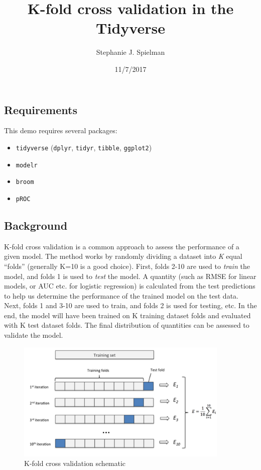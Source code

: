 \documentclass[]{article}
\title{K-fold cross validation in the Tidyverse}
\author{Stephanie J. Spielman}
\date{11/7/2017}
\providecommand{\tightlist}{%
  \setlength{\itemsep}{0pt}\setlength{\parskip}{0pt}}
\begin{document}
\maketitle

\subsection{Requirements}\label{requirements}

This demo requires several packages:

\begin{itemize}
\tightlist
\item
  \texttt{tidyverse} (\texttt{dplyr}, \texttt{tidyr}, \texttt{tibble},
  \texttt{ggplot2})
\item
  \texttt{modelr}
\item
  \texttt{broom}
\item
  \texttt{pROC}
\end{itemize}

\subsection{Background}\label{background}



K-fold cross validation is a common approach to assess the performance
of a given model. The method works by randomly dividing a dataset into
\emph{K} equal ``folds'' (generally K=10 is a good choice). First, folds
2-10 are used to \emph{train} the model, and folds 1 is used to
\emph{test} the model. A quantity (such as RMSE for linear models, or
AUC etc. for logistic regression) is calculated from the test
predictions to help us determine the performance of the trained model on
the test data. Next, folds 1 and 3-10 are used to train, and folds 2 is
used for testing, etc. In the end, the model will have been trained on K
training dataset folds and evaluated with K test dataset folds. The
final distribution of quantities can be assessed to validate the model.

\begin{figure}[H]
\centering
\includegraphics[width=4in]{k-fold.png}
\caption{K-fold cross validation schematic}
\end{figure}
\end{document}
